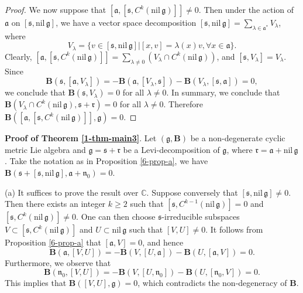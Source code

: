 \documentclass[reqno]{amsart}
\theoremstyle{definition}
\begin{document}
\begin{proof}
We now suppose  that $[\mathfrak{a},[\mathfrak{s},C^{k}(\mathrm{nil}\,\mathfrak{g})]]\neq0$. Then under the action of $\mathfrak{a}$ on $[\mathfrak{s},\mathrm{nil}\,\mathfrak{g}]$, we have a vector space decomposition
$[\mathfrak{s},\mathrm{nil}\,\mathfrak{g}]=\sum_{\lambda\in \mathfrak{a}^{*}}V_{\lambda}$, where
$$V_{\lambda}=\{v\in[\mathfrak{s},\mathrm{nil}\,\mathfrak{g}]|[x,v]=\lambda(x)v,\forall x\in \mathfrak{a} \}.$$
Clearly,
$[\mathfrak{a},[\mathfrak{s},C^{k}(\mathrm{nil}\,\mathfrak{g})]]
=\sum_{\lambda\neq0}\left(V_{\lambda}\cap C^{k}(\mathrm{nil}\,\mathfrak{g})\right)$,
and $[\mathfrak{s},V_{\lambda}]=V_{\lambda}$.
Since
\begin{equation*}
  \mathbf{B}(\mathfrak{s},[\mathfrak{a},V_{\lambda}])
=-\mathbf{B}(\mathfrak{a},[V_{\lambda},\mathfrak{s}])-\mathbf{B}(V_{\lambda},[\mathfrak{s},\mathfrak{a}])=0,
\end{equation*}
we  conclude that $\mathbf{B}(\mathfrak{s},V_{\lambda})=0$ for all $\lambda\neq0$.
In summary, we conclude that
$\mathbf{B}(V_{\lambda}\cap C^{k}(\mathrm{nil}\,\mathfrak{g}),
\mathfrak{s}+\mathfrak{r})=0$ for all $\lambda\neq0$. Therefore $\mathbf{B}([\mathfrak{a},[\mathfrak{s},C^{k}(\mathrm{nil}\,\mathfrak{g})]],\mathfrak{g})=0$.
\end{proof}



\textbf{Proof of Theorem \ref{1-thm-main3}}.
Let $(\mathfrak{g},\mathbf{B})$ be  a non-degenerate cyclic metric Lie algebra and $\mathfrak{g}=\mathfrak{s}+\mathfrak{r}$ be a Levi-decomposition of $\mathfrak{g}$, where $\mathfrak{r}=\mathfrak{a}+\mathrm{nil}\,\mathfrak{g}$.
 Take the notation as in Proposition \ref{6-prop-a},  we have
$\mathbf{B}(\mathfrak{s}+[\mathfrak{s},\mathrm{nil}\,\mathfrak{g}],\mathfrak{a}+\mathfrak{n}_{0})=0.$


(a) It suffices to prove the result over $\mathbb{C}$. Suppose conversely that $[\mathfrak{s},\mathrm{nil}\,\mathfrak{g}]\neq 0$. Then there exists an integer $k\geq2$ such that
$[\mathfrak{s},C^{k-1}(\mathrm{nil}\,\mathfrak{g})]=0$ and $[\mathfrak{s},C^{k}(\mathrm{nil}\,\mathfrak{g})]\neq0$.
 One can then choose $\mathfrak{s}$-irreducible subspaces $V\subset [\mathfrak{s},C^{k}(\mathrm{nil}\,\mathfrak{g})]$ and $U\subset \mathrm{nil}\,\mathfrak{g}$ such that
$[V,U]\neq0$. It follows from Proposition \ref{6-prop-a} that $[\mathfrak{a},V]=0$, and hence
\begin{equation*}
  \mathbf{B}(\mathfrak{a},[V,U])=-\mathbf{B}(V,[U,\mathfrak{a}])-\mathbf{B}(U,[\mathfrak{a},V])=0.
\end{equation*}
Furthermore, we observe that
\begin{equation*}
 \mathbf{B}(\mathfrak{n}_{0},[V,U])=-\mathbf{B}(V,[U,\mathfrak{n}_{0}])-\mathbf{B}(U,[\mathfrak{n}_{0},V])=0.
\end{equation*}
This implies that $\mathbf{B}([V,U],\mathfrak{g})=0$, which contradicts the non-degeneracy of $\mathbf{B}$.
\end{document}
